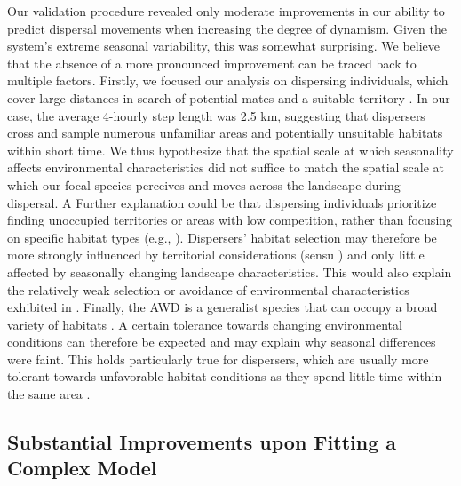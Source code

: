 \documentclass[abstract=on,10pt,a4paper,bibliography=totocnumbered]{article}
\begin{document}
Our validation procedure revealed only moderate improvements in our ability to
predict dispersal movements when increasing the degree of dynamism. Given the
system's extreme seasonal variability, this was somewhat surprising. We believe
that the absence of a more pronounced improvement can be traced back to multiple
factors. Firstly, we focused our analysis on dispersing individuals, which cover
large distances in search of potential mates and a suitable territory
\citep{McNutt.1996, Cozzi.2020}. In our case, the average 4-hourly step length
was 2.5 km, suggesting that dispersers cross and sample numerous unfamiliar
areas and potentially unsuitable habitats within short time. We thus hypothesize
that the spatial scale at which seasonality affects environmental
characteristics did not suffice to match the spatial scale at which our focal
species perceives and moves across the landscape during dispersal. A Further
explanation could be that dispersing individuals prioritize finding unoccupied
territories or areas with low competition, rather than focusing on specific
habitat types (e.g., \citealp{Creel.1996, Creel.2001}). Dispersers' habitat
selection may therefore be more strongly influenced by territorial
considerations (sensu \citealp{Cozzi.2018}) and only little affected by
seasonally changing landscape characteristics. This would also explain the
relatively weak selection or avoidance of environmental characteristics
exhibited in . Finally, the AWD is a generalist species that
can occupy a broad variety of habitats \citep{Woodroffe.2011}. A certain
tolerance towards changing environmental conditions can therefore be expected
and may explain why seasonal differences were faint. This holds particularly
true for dispersers, which are usually more tolerant towards unfavorable habitat
conditions as they spend little time within the same area \citep{ONeill.2020}.

\subsection{Substantial Improvements upon Fitting a Complex Model}
\end{document}
